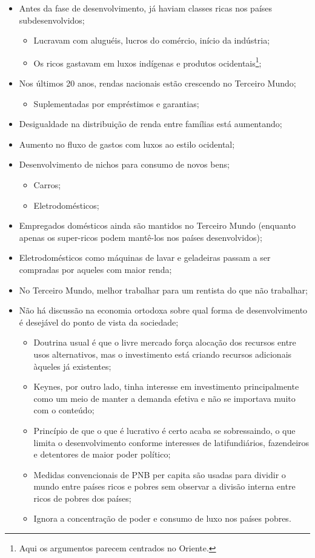 	\begin{itemize}
		\item Antes da fase de desenvolvimento, já haviam classes ricas nos países subdesenvolvidos;
			\begin{itemize}
				\item Lucravam com aluguéis, lucros do comércio, início da indústria;
				\item Os ricos gastavam em luxos indígenas e produtos ocidentais\footnote{Aqui os argumentos parecem centrados no Oriente.};
			\end{itemize}
		\item Nos últimos 20 anos, rendas nacionais estão crescendo no Terceiro Mundo;
			\begin{itemize}
				\item Suplementadas por empréstimos e garantias;
			\end{itemize}
		\item Desigualdade na distribuição de renda entre famílias está aumentando;
		\item Aumento no fluxo de gastos com luxos ao estilo ocidental;
		\item Desenvolvimento de nichos para consumo de novos bens;
			\begin{itemize}
				\item Carros;
				\item Eletrodomésticos;
			\end{itemize}
		\item Empregados domésticos ainda são mantidos no Terceiro Mundo (enquanto apenas os super-ricos podem mantê-los nos países desenvolvidos);
		\item Eletrodomésticos como máquinas de lavar e geladeiras passam a ser compradas por aqueles com maior renda;
		\item No Terceiro Mundo, melhor trabalhar para um rentista do que não trabalhar;
		\item Não há discussão na economia ortodoxa sobre qual forma de desenvolvimento é desejável do ponto de vista da sociedade;
			\begin{itemize}
				\item Doutrina usual é que o livre mercado força alocação dos recursos entre usos alternativos, mas o investimento está criando recursos adicionais àqueles já existentes;
				\item Keynes, por outro lado, tinha interesse em investimento principalmente como um meio de manter a demanda efetiva e não se importava muito com o conteúdo;
				\item Princípio de que o que é lucrativo é certo acaba se sobressaindo, o que limita o desenvolvimento conforme interesses de latifundiários, fazendeiros e detentores de maior poder político;
				\item Medidas convencionais de PNB per capita são usadas para dividir o mundo entre países ricos e pobres sem observar a divisão interna entre ricos de pobres dos países;
				\item Ignora a concentração de poder e consumo de luxo nos países pobres.
			\end{itemize}
	\end{itemize}
	
